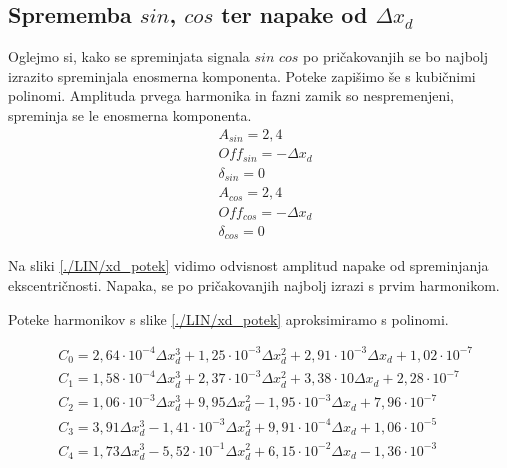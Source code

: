 \subsection{Sprememba $sin$, $cos$ ter napake od $\Delta x_d$}
Oglejmo si, kako se spreminjata signala $sin$ $cos$ po pričakovanjih se bo najbolj izrazito spreminjala enosmerna komponenta.
Poteke zapišimo še s kubičnimi polinomi. Amplituda prvega harmonika in fazni zamik so nespremenjeni, spreminja se le enosmerna komponenta.
\begin{eqnarray}
\label{analog_lin_xd}
&A_{sin} = 2,4\\
&Off_{sin} = -\Delta x_d \\
&\delta_{sin} =0 \\
&A_{cos} = 2,4\\
&Off_{cos} = -\Delta x_d\\
&\delta_{cos} = 0
\end{eqnarray}

Na sliki \ref{./LIN/xd_potek} vidimo odvisnost amplitud napake od spreminjanja ekscentričnosti. Napaka, se po pričakovanjih najbolj izrazi s prvim harmonikom.


Poteke harmonikov s slike \ref{./LIN/xd_potek} aproksimiramo  s polinomi. 

\begin{eqnarray}
\label{nap_lin_xd}
&C_0 =2,64\cdot 10^{-4}\Delta x_d^{3}+1,25\cdot 10^{-3}\Delta x_d^{2}+2,91\cdot 10^{-3}\Delta x_d+1,02\cdot 10^{-7} \\
&C_1 =1,58\cdot 10^{-4}\Delta x_d^{3}+2,37\cdot 10^{-3}\Delta x_d^{2}+3,38\cdot 10\Delta x_d+2,28\cdot 10^{-7} \\     
&C_2 =1,06\cdot 10^{-3}\Delta x_d^{3}+9,95\Delta x_d^{2}-1,95\cdot 10^{-3}\Delta x_d+7,96\cdot 10^{-7} \\             
&C_3 =3,91\Delta x_d^{3}-1,41\cdot 10^{-3}\Delta x_d^{2}+9,91\cdot 10^{-4}\Delta x_d+1,06\cdot 10^{-5} \\               
&C_4 =1,73\Delta x_d^{3}-5,52\cdot 10^{-1}\Delta x_d^{2}+6,15\cdot 10^{-2}\Delta x_d-1,36\cdot 10^{-3}            
\end{eqnarray}

